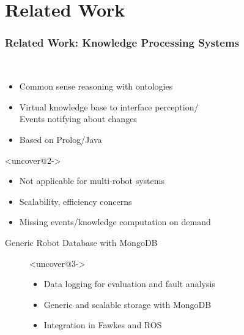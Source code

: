 \section{Related Work}
\begin{frame}
  \frametitle{Related Work: Knowledge Processing Systems}
  \begin{description}[]
  \item[KnowRob/OpenRobots Ontology (ORO)]<uncover@1-> \hfill \\
    \begin{itemize}
    \item Common sense reasoning with ontologies
    \item Virtual knowledge base to interface perception/\\
          Events notifying about changes
    \item Based on Prolog/Java
    \end{itemize}
  \end{description}
  \begin{block}{}<uncover@2->
  \begin{itemize}
  \item Not applicable for multi-robot systems
  \item Scalability, efficiency concerns
  \item Missing events/knowledge computation on demand
  \end{itemize}
  \end{block}
  \begin{description}
  \item[Generic Robot Database with MongoDB]<uncover@3-> \hfill \\
    \begin{itemize}
    \item Data logging for evaluation and fault analysis
    \item Generic and scalable storage with MongoDB
    \item Integration in Fawkes and ROS
    \end{itemize}
  \end{description}
\end{frame}

